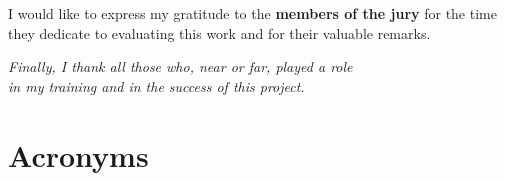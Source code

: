 \documentclass[12pt,a4paper]{report}
\begin{document}
\vspace{0.9cm}

I would like to express my gratitude to the \textbf{members of the jury} for the time
they dedicate to evaluating this work and for their valuable remarks.

\vspace{1.1cm}

\begin{flushright}
\itshape
Finally, I thank all those who, near or far, played a role\\
in my training and in the success of this project.
\end{flushright}

\newpage
\renewcommand{\contentsname}{Table of Contents}
\tableofcontents

\newpage
\renewcommand{\listfigurename}{List of Figures}
\listoffigures

\newpage
\renewcommand{\listtablename}{List of Tables}
\listoftables

\newpage
\thispagestyle{fancy}
\section*{Acronyms}
\end{document}
